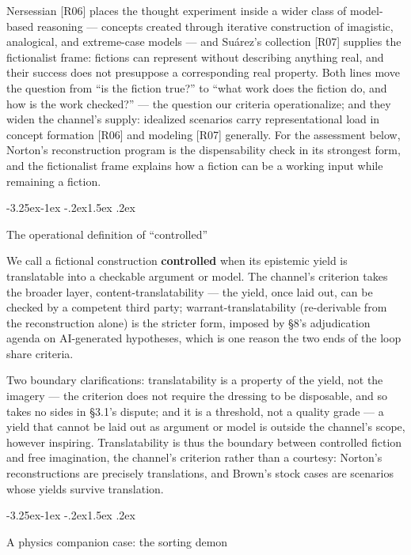 \documentclass[11pt,a4paper]{article}
\makeatletter
\renewcommand\subsection{\@startsection{subsection}{2}{\z@}%
  {-3.25ex\@plus -1ex \@minus -.2ex}{1.5ex \@plus .2ex}%
  {\normalfont\large\bfseries\raggedright}}
\makeatother
\begin{document}
Nersessian [R06] places the thought experiment inside a wider class of model-based reasoning — concepts created through iterative construction of imagistic, analogical, and extreme-case models — and Suárez's collection [R07] supplies the fictionalist frame: fictions can represent without describing anything real, and their success does not presuppose a corresponding real property. Both lines move the question from ``is the fiction true?'' to ``what work does the fiction do, and how is the work checked?'' — the question our criteria operationalize; and they widen the channel's supply: idealized scenarios carry representational load in concept formation [R06] and modeling [R07] generally. For the assessment below, Norton's reconstruction program is the dispensability check in its strongest form, and the fictionalist frame explains how a fiction can be a working input while remaining a fiction.

\subsection{The operational definition of ``controlled''}

We call a fictional construction \textbf{controlled} when its epistemic yield is translatable into a checkable argument or model. The channel's criterion takes the broader layer, content-translatability — the yield, once laid out, can be checked by a competent third party; warrant-translatability (re-derivable from the reconstruction alone) is the stricter form, imposed by §8's adjudication agenda on AI-generated hypotheses, which is one reason the two ends of the loop share criteria.

Two boundary clarifications: translatability is a property of the yield, not the imagery — the criterion does not require the dressing to be disposable, and so takes no sides in §3.1's dispute; and it is a threshold, not a quality grade — a yield that cannot be laid out as argument or model is outside the channel's scope, however inspiring. Translatability is thus the boundary between controlled fiction and free imagination, the channel's criterion rather than a courtesy: Norton's reconstructions are precisely translations, and Brown's stock cases are scenarios whose yields survive translation.

\subsection{A physics companion case: the sorting demon}
\end{document}
